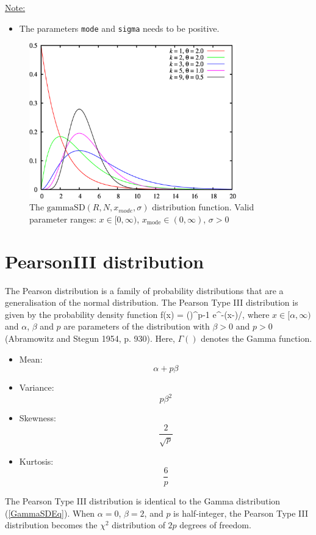 \noindent\underline{Note:}
\begin{itemize}
\item The parameters \texttt{mode} and \texttt{sigma} needs to be positive.
\end{itemize}

\begin{figure}[htb]
\begin{center}
\includegraphics[width=0.8\textwidth,height=0.6\textwidth]{Gamma_distribution_pdf.png}
\end{center}
\caption{The $\text{gammaSD}(R,N,x_{mode},\sigma)$ distribution
function.
Valid parameter ranges:
$x\in [0,\infty)$,
$x_\text{mode} \in (0,\infty)$,
$\sigma > 0$}
\label{GammaSD}
\end{figure}

\clearpage
\section{PearsonIII distribution}

The Pearson distribution is a family of probability distributions
that are a generalisation of the normal distribution. The Pearson
Type III distribution is given by the probability density function
\BE
    f(x) =  \left(\right)^{p-1} e^{-(x-\alpha)/\beta}, \!
\EE where $x \in [\alpha,\infty)$ and $\alpha$, $\beta$ and $p$
are parameters of the distribution with $\beta > 0$ and $p > 0$
(Abramowitz and Stegun 1954, p. 930). Here, $\Gamma ()$ denotes
the Gamma function.
\begin{itemize}
\item Mean:
$$
    \alpha + p\beta
$$
\item Variance:
$$
    p\beta^2
$$
\item Skewness:
$$
    \frac{2}{\sqrt{p}}
$$
\item Kurtosis:
$$
    \frac{6}{p}
$$
\end{itemize}
The Pearson Type III distribution is identical to the Gamma
distribution (\ref{GammaSDEq}). When $\alpha=0$, $\beta=2$, and
$p$ is half-integer, the Pearson Type III distribution becomes the
$\chi^2$ distribution of $2p$ degrees of freedom.

